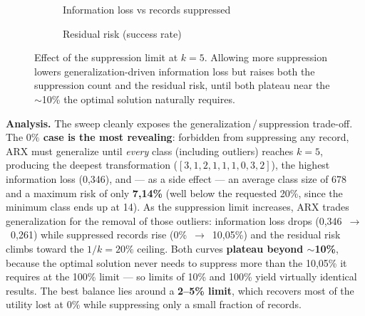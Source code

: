 \documentclass[10pt,a4paper]{article}
\begin{document}
\begin{figure}[h]
\centering
\begin{subfigure}{0.49\textwidth}
\centering
{}
\caption{Information loss vs records suppressed}
\end{subfigure}\hfill
\begin{subfigure}{0.49\textwidth}
\centering
{}
\caption{Residual risk (success rate)}
\end{subfigure}
\caption{Effect of the suppression limit at $k=5$. Allowing more suppression lowers generalization-driven
information loss but raises both the suppression count and the residual risk, until both plateau near the
$\sim$10\% the optimal solution naturally requires.}
\label{fig:supp}
\end{figure}

\textbf{Analysis.} The sweep cleanly exposes the generalization\,/\,suppression trade-off. The
\textbf{$0\%$ case is the most revealing}: forbidden from suppressing any record, ARX must generalize until
\emph{every} class (including outliers) reaches $k=5$, producing the deepest transformation
($[3,1,2,1,1,1,0,3,2]$), the highest information loss (0{,}346), and --- as a side effect --- an average class
size of 678 and a maximum risk of only \textbf{7{,}14\%} (well below the requested 20\%, since the minimum class
ends up at 14). As the suppression limit increases, ARX trades generalization for the removal of those outliers:
information loss drops (0{,}346~$\to$~0{,}261) while suppressed records rise (0\%~$\to$~10{,}05\%) and the
residual risk climbs toward the $1/k=20\%$ ceiling. Both curves \textbf{plateau beyond $\sim$10\%}, because the
optimal solution never needs to suppress more than the 10{,}05\% it requires at the 100\% limit --- so limits of
10\% and 100\% yield virtually identical results. The best balance lies around a \textbf{2--5\% limit}, which
recovers most of the utility lost at 0\% while suppressing only a small fraction of records.
\end{document}
